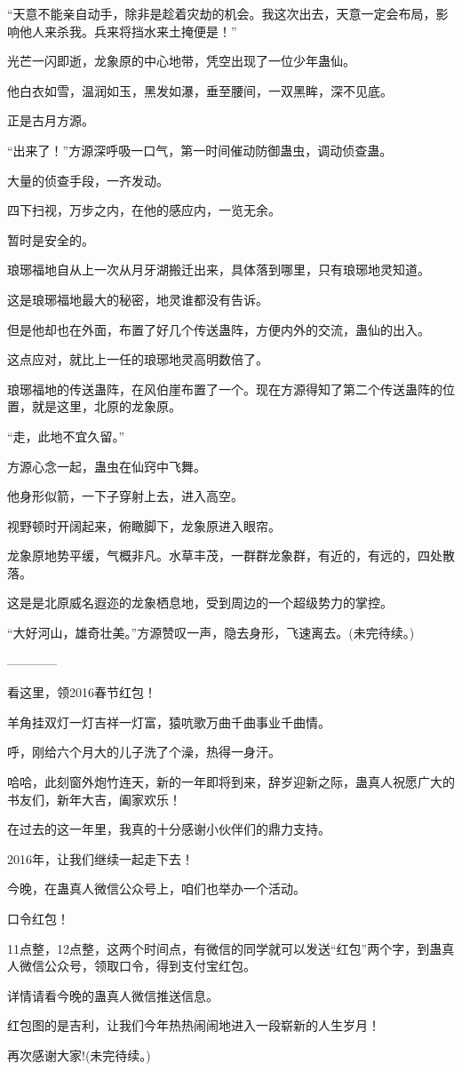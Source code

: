 \begin{this_body}
“天意不能亲自动手，除非是趁着灾劫的机会。我这次出去，天意一定会布局，影响他人来杀我。兵来将挡水来土掩便是！”

光芒一闪即逝，龙象原的中心地带，凭空出现了一位少年蛊仙。

他白衣如雪，温润如玉，黑发如瀑，垂至腰间，一双黑眸，深不见底。

正是古月方源。

“出来了！”方源深呼吸一口气，第一时间催动防御蛊虫，调动侦查蛊。

大量的侦查手段，一齐发动。

四下扫视，万步之内，在他的感应内，一览无余。

暂时是安全的。

琅琊福地自从上一次从月牙湖搬迁出来，具体落到哪里，只有琅琊地灵知道。

这是琅琊福地最大的秘密，地灵谁都没有告诉。

但是他却也在外面，布置了好几个传送蛊阵，方便内外的交流，蛊仙的出入。

这点应对，就比上一任的琅琊地灵高明数倍了。

琅琊福地的传送蛊阵，在风伯崖布置了一个。现在方源得知了第二个传送蛊阵的位置，就是这里，北原的龙象原。

“走，此地不宜久留。”

方源心念一起，蛊虫在仙窍中飞舞。

他身形似箭，一下子穿射上去，进入高空。

视野顿时开阔起来，俯瞰脚下，龙象原进入眼帘。

龙象原地势平缓，气概非凡。水草丰茂，一群群龙象群，有近的，有远的，四处散落。

这是是北原威名遐迩的龙象栖息地，受到周边的一个超级势力的掌控。

“大好河山，雄奇壮美。”方源赞叹一声，隐去身形，飞速离去。(未完待续。)

------------

看这里，领2016春节红包！

羊角挂双灯一灯吉祥一灯富，猿吭歌万曲千曲事业千曲情。

呼，刚给六个月大的儿子洗了个澡，热得一身汗。

哈哈，此刻窗外炮竹连天，新的一年即将到来，辞岁迎新之际，蛊真人祝愿广大的书友们，新年大吉，阖家欢乐！

在过去的这一年里，我真的十分感谢小伙伴们的鼎力支持。

2016年，让我们继续一起走下去！

今晚，在蛊真人微信公众号上，咱们也举办一个活动。

口令红包！

11点整，12点整，这两个时间点，有微信的同学就可以发送“红包”两个字，到蛊真人微信公众号，领取口令，得到支付宝红包。

详情请看今晚的蛊真人微信推送信息。

红包图的是吉利，让我们今年热热闹闹地进入一段崭新的人生岁月！

再次感谢大家!(未完待续。)

\end{this_body}

